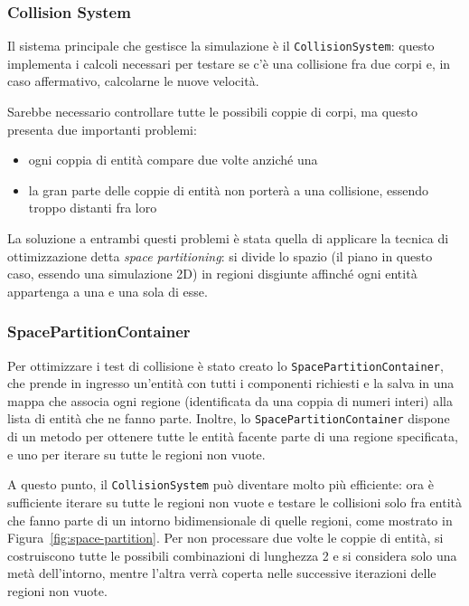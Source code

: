 \subsubsection{Collision System}\label{subsec:container}
Il sistema principale che gestisce la simulazione è il \texttt{CollisionSystem}: questo implementa i calcoli necessari
per testare se c'è una collisione fra due corpi e, in caso affermativo, calcolarne le nuove velocità.

Sarebbe necessario controllare tutte le possibili coppie di corpi, ma questo presenta due importanti problemi:
\begin{itemize}
    \item ogni coppia di entità compare due volte anziché una
    \item la gran parte delle coppie di entità non porterà a una collisione, essendo troppo distanti fra loro
\end{itemize}

La soluzione a entrambi questi problemi è stata quella di applicare la tecnica di ottimizzazione detta
\textit{space partitioning}: si divide lo spazio (il piano in questo caso, essendo una simulazione 2D) in regioni disgiunte
affinché ogni entità appartenga a una e una sola di esse.

\subsubsection{SpacePartitionContainer}
Per ottimizzare i test di collisione è stato creato lo \texttt{SpacePartitionContainer}, che prende in ingresso
un'entità con tutti i componenti richiesti e la salva in una mappa che associa ogni regione (identificata da una coppia
di numeri interi) alla lista di entità che ne fanno parte.
Inoltre, lo \texttt{SpacePartitionContainer} dispone di un metodo per ottenere tutte le entità facente parte di una regione
specificata, e uno per iterare su tutte le regioni non vuote.

A questo punto, il \texttt{CollisionSystem} può diventare molto più efficiente: ora è sufficiente iterare su tutte le regioni
non vuote e testare le collisioni solo fra entità che fanno parte di un intorno bidimensionale di quelle regioni, come
mostrato in Figura~\ref{fig:space-partition}.
Per non processare due volte le coppie di entità, si costruiscono tutte le possibili combinazioni di lunghezza 2 e si
considera solo una metà dell'intorno, mentre l'altra verrà coperta nelle successive iterazioni delle regioni non vuote.

